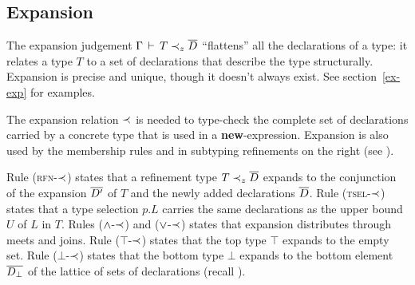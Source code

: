 \documentclass[9pt]{sigplanconf}
\begin{document}
\subsection{Expansion}

The expansion judgement $\Gamma \,\vdash\, T \prec_z {\overline{D}}$
``flattens'' all the declarations of a type: it relates a type $T$ to
a set of declarations that describe the type structurally. Expansion
is precise and unique, though it doesn't always exist. See
section~\ref{ex-exp} for examples.
      
The expansion relation $\prec$ is needed to type-check the complete
set of declarations carried by a concrete type that is used in a
\textbf{new}-expression. Expansion is also used by the membership
rules and in subtyping refinements on the right (see
).

Rule (\textsc{rfn-$\prec$}) states that a refinement type $T
\prec_z {\overline{D}}$ expands to the conjunction of the expansion $\overline{D'}$
of $T$ and the newly added declarations $\overline{D}$. Rule
(\textsc{tsel-$\prec$}) states that a type selection $p.L$ carries
the same declarations as the upper bound $U$ of $L$ in $T$.  Rules
($\wedge$-$\prec$) and ($\vee$-$\prec$) states that expansion
distributes through meets and joins.  Rule (\textsc{$\top$-$\prec$})
states that the top type $\top$ expands to the empty set. Rule
(\textsc{$\bot$-$\prec$}) states that the bottom type $\bot$ expands
to the bottom element $\overline{D_\bot}$ of the lattice of sets of
declarations (recall ).
\end{document}
